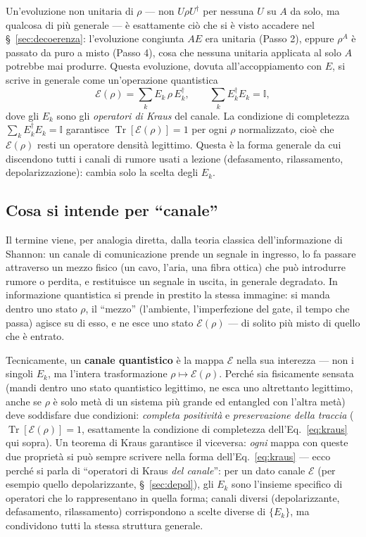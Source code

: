 \documentclass[11pt,a4paper]{article}
\newcommand{\Tr}{\operatorname{Tr}}
\begin{document}
Un'evoluzione non unitaria di $\rho$ --- non $U\rho U^\dagger$ per nessuna $U$ su $A$
da solo, ma qualcosa di più generale --- è esattamente ciò che si è visto accadere nel
\S~\ref{sec:decoerenza}: l'evoluzione congiunta $AE$ era unitaria (Passo 2), eppure
$\rho^A$ è passato da puro a misto (Passo 4), cosa che nessuna unitaria applicata al
solo $A$ potrebbe mai produrre. Questa evoluzione, dovuta all'accoppiamento con $E$, si
scrive in generale come un'operazione quantistica
\begin{equation}
\mathcal E(\rho) = \sum_k E_k\,\rho\,E_k^\dagger, \qquad
\sum_k E_k^\dagger E_k = \mathbb{I},
\label{eq:kraus}
\end{equation}
dove gli $E_k$ sono gli \emph{operatori di Kraus} del canale. La condizione di
completezza $\sum_k E_k^\dagger E_k=\mathbb{I}$ garantisce $\Tr[\mathcal E(\rho)]=1$
per ogni $\rho$ normalizzato, cioè che $\mathcal E(\rho)$ resti un operatore densità
legittimo. Questa è la forma generale da cui discendono tutti i canali di rumore usati
a lezione (defasamento, rilassamento, depolarizzazione): cambia solo la scelta degli
$E_k$.

\subsection{Cosa si intende per ``canale''}

Il termine viene, per analogia diretta, dalla teoria classica dell'informazione di
Shannon: un canale di comunicazione prende un segnale in ingresso, lo fa passare
attraverso un mezzo fisico (un cavo, l'aria, una fibra ottica) che può introdurre
rumore o perdita, e restituisce un segnale in uscita, in generale degradato. In
informazione quantistica si prende in prestito la stessa immagine: si manda dentro
uno stato $\rho$, il ``mezzo'' (l'ambiente, l'imperfezione del gate, il tempo che
passa) agisce su di esso, e ne esce uno stato $\mathcal E(\rho)$ --- di solito più
misto di quello che è entrato.

Tecnicamente, un \textbf{canale quantistico} è la mappa $\mathcal E$ nella sua
interezza --- non i singoli $E_k$, ma l'intera trasformazione $\rho\mapsto\mathcal
E(\rho)$. Perché sia fisicamente sensata (mandi dentro uno stato quantistico
legittimo, ne esca uno altrettanto legittimo, anche se $\rho$ è solo metà di un
sistema più grande ed entangled con l'altra metà) deve soddisfare due condizioni:
\emph{completa positività} e \emph{preservazione della traccia}
($\Tr[\mathcal E(\rho)]=1$, esattamente la condizione di completezza
dell'Eq.~\eqref{eq:kraus} qui sopra). Un teorema di Kraus garantisce il viceversa:
\emph{ogni} mappa con queste due proprietà si può sempre scrivere nella forma
dell'Eq.~\eqref{eq:kraus} --- ecco perché si parla di ``operatori di Kraus \emph{del
canale}'': per un dato canale $\mathcal E$ (per esempio quello depolarizzante,
\S~\ref{sec:depol}), gli $E_k$ sono l'insieme specifico di operatori che lo
rappresentano in quella forma; canali diversi (depolarizzante, defasamento,
rilassamento) corrispondono a scelte diverse di $\{E_k\}$, ma condividono tutti la
stessa struttura generale.
\end{document}
